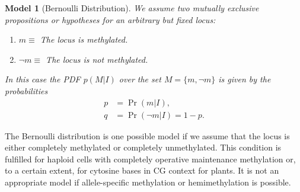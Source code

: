 \documentclass[a4paper]{article}
\newtheorem{model}{Model}
\begin{document}
\begin{model}[Bernoulli Distribution]\label{mod:bernoulli}
  We assume two mutually exclusive propositions or hypotheses for an
  arbitrary but fixed locus:
\begin{enumerate}
\item $m \equiv$ The locus is methylated.
\item $\neg m \equiv$ The locus is \emph{not} methylated.
\end{enumerate}
In this case the PDF $p(M|I)$ over the set $M=\{m, \neg m\}$ is given
by the probabilities
\begin{align}
p &= \Pr(m|I),\\
q &= \Pr(\neg m|I) = 1 - p.
\end{align}
\end{model}
The Bernoulli distribution is one possible model if we assume that the
locus is either completely methylated or completely unmethylated. This
condition is fulfilled for haploid cells with completely operative
maintenance methylation or, to a certain extent, for cytosine bases in
CG context for plants. It is not an appropriate model if
allele-specific methylation or hemimethylation is possible.
\end{document}
